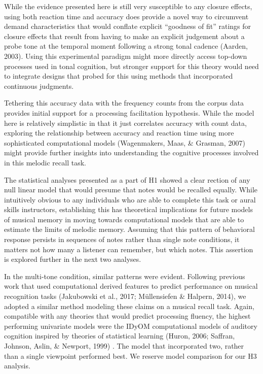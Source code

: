 \documentclass[english,man,floatsintext]{apa6}
\begin{document}
While the evidence presented here is still very susceptible to any closure effects, using both reaction time and accuracy does provide a novel way to circumvent demand characteristics that would conflate explicit \enquote{goodness of fit} ratings for closure effects that result from having to make an explicit judgement about a probe tone at the temporal moment following a strong tonal cadence (Aarden, 2003).
Using this experimental paradigm might more directly access top-down processes used in tonal cognition, but stronger support for this theory would need to integrate designs that probed for this using methods that incorporated continuous judgments.

Tethering this accuracy data with the frequency counts from the corpus data provides initial support for a processing facilitation hypothesis.
While the model here is relatively simplistic in that it just correlates accuracy with count data, exploring the relationship between accuracy and reaction time using more sophisticated computational models (Wagenmakers, Maas, \& Grasman, 2007) might provide further insights into understanding the cognitive processes involved in this melodic recall task.

The statistical analyses presented as a part of H1 showed a clear rection of any null linear model that would presume that notes would be recalled equally.
While intuitively obvious to any individuals who are able to complete this task or aural skills instructors, establishing this has theoretical implications for future models of musical memory in moving towards computational models that are able to estimate the limits of melodic memory.
Assuming that this pattern of behavioral response persists in sequences of notes rather than single note conditions, it matters not how many a listener can remember, but which notes.
This assertion is explored further in the next two analyses.

In the multi-tone condition, similar patterns were evident. Following previous work that used computational derived features to predict performance on musical recognition tasks (Jakubowski et al., 2017; Müllensiefen \& Halpern, 2014), we adopted a similar method modeling these claims on a musical recall task.
Again, compatible with any theories that would predict processing fluency, the highest performing univariate models were the IDyOM computational models of auditory cognition inspired by theories of statistical learning (Huron, 2006; Saffran, Johnson, Aslin, \& Newport, 1999) .
The model that incorporated two, rather than a single viewpoint performed best.
We reserve model comparison for our H3 analysis.
\end{document}

